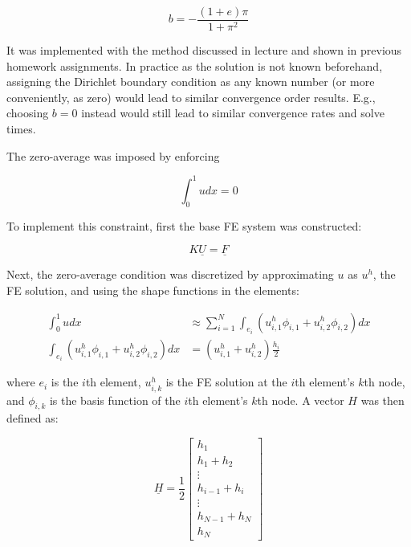 \documentclass[a4paper, 12pt]{article}
\begin{document}
\begin{equation}
  b = - \frac{(1+e)\pi}{1+\pi^2}
\end{equation}

\noindent
It was implemented with the method discussed in lecture
and shown in previous homework assignments.
In practice as the solution is not known beforehand,
assigning the Dirichlet boundary condition as any known number
(or more conveniently, as zero) would lead to similar 
convergence order results.
E.g., choosing $b = 0$ instead would still 
lead to similar convergence rates and solve times.

The zero-average was imposed by enforcing

\begin{equation}
  \int_0^1 u dx = 0
\end{equation}

\noindent
To implement this constraint, first the base FE system 
was constructed:

\begin{equation} \label{original_system}
  K \underline{U} = \underline{F}
\end{equation}

\noindent
Next, the zero-average condition was discretized 
by approximating $u$ as $u^h$, the FE solution,
and using the shape functions in the elements:

\begin{align}
  \int_0^1 u dx &\approx \sum_{i=1}^N \int_{e_i} (u^h_{i,1} \phi_{i,1} + u^h_{i,2} \phi_{i,2}) dx \\
  \int_{e_i} (u^h_{i,1} \phi_{i,1} + u^h_{i,2} \phi_{i,2}) dx &= (u^h_{i,1} + u^h_{i,2}) \frac{h_i}{2} 
\end{align}

\noindent
where $e_i$ is the $i$th element, 
$u^h_{i,k}$ is the FE solution at the $i$th element's $k$th node, 
and
$\phi_{i,k}$ is the basis function of the $i$th element's $k$th node.
A vector $H$ was then defined as:

\begin{equation}
  \underline{H} = \frac{1}{2}
    \begin{bmatrix}
      h_1\\
      h_1 + h_2\\
      \vdots\\
      h_{i-1} + h_i\\
      \vdots\\
      h_{N-1} + h_N\\
      h_N
    \end{bmatrix}
\end{equation}
\end{document}
